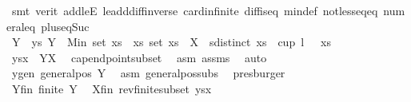 \begin{isabellebody}
\ {\isacharparenleft}{\kern0pt}smt\ {\isacharparenleft}{\kern0pt}verit{\isacharparenright}{\kern0pt}\ add{\isacharunderscore}{\kern0pt}leE\ le{\isacharunderscore}{\kern0pt}add{\isacharunderscore}{\kern0pt}diff{\isacharunderscore}{\kern0pt}inverse\ card{\isachardot}{\kern0pt}infinite\ diff{\isacharunderscore}{\kern0pt}is{\isacharunderscore}{\kern0pt}{}{\isacharunderscore}{\kern0pt}eq\ min{\isacharunderscore}{\kern0pt}def\ not{\isacharunderscore}{\kern0pt}less{\isacharunderscore}{\kern0pt}eq{\isacharunderscore}{\kern0pt}eq\ numeral{\isacharunderscore}{\kern0pt}{}{\isacharunderscore}{\kern0pt}eq{\isacharunderscore}{\kern0pt}{}\ plus{\isacharunderscore}{\kern0pt}{}{\isacharunderscore}{\kern0pt}eq{\isacharunderscore}{\kern0pt}Suc{\isacharparenright}{\kern0pt}\isanewline
\isanewline
\ \ \ \ \ \ \ \ \isamarkupfalse%
\ Y\ \ ys{\isacharcolon}{\kern0pt}\ {\isachardoublequoteopen}Y\ {\isacharequal}{\kern0pt}\ {\isacharbraceleft}{\kern0pt}Min\ {\isacharparenleft}{\kern0pt}set\ xs{\isacharparenright}{\kern0pt}\ {\isacharbar}{\kern0pt}\ xs{\isachardot}{\kern0pt}\ set\ xs\ {\isasymsubseteq}\ X\ {\isasymand}\ sdistinct\ xs\ {\isasymand}\ cup\ {\isacharparenleft}{\kern0pt}l\ {\isacharminus}{\kern0pt}\ {}{\isacharparenright}{\kern0pt}\ xs{\isacharbraceright}{\kern0pt}{\isachardoublequoteclose}\isanewline
\ \ \ \ \ \ \ \ \isamarkupfalse%
\ ysx{\isacharcolon}{\kern0pt}\ \ {\isachardoublequoteopen}Y{\isasymsubseteq}X{\isachardoublequoteclose}\ \isamarkupfalse%
\ cap{\isacharunderscore}{\kern0pt}endpoint{\isacharunderscore}{\kern0pt}subset\ \isamarkupfalse%
\ asm\ assms\ \isamarkupfalse%
\ auto\isanewline
\ \ \ \ \ \ \ \ \isamarkupfalse%
\ ygen{\isacharcolon}{\kern0pt}\ {\isachardoublequoteopen}general{\isacharunderscore}{\kern0pt}pos\ Y{\isachardoublequoteclose}\ \isamarkupfalse%
\ asm{\isacharparenleft}{\kern0pt}{}{\isacharparenright}{\kern0pt}\ general{\isacharunderscore}{\kern0pt}pos{\isacharunderscore}{\kern0pt}subs\ \isamarkupfalse%
\ presburger\isanewline
\ \ \ \ \ \ \ \ \isamarkupfalse%
\ Y{\isacharunderscore}{\kern0pt}fin{\isacharcolon}{\kern0pt}\ {\isachardoublequoteopen}finite\ Y{\isachardoublequoteclose}\ \isamarkupfalse%
\ X{\isacharunderscore}{\kern0pt}fin\ rev{\isacharunderscore}{\kern0pt}finite{\isacharunderscore}{\kern0pt}subset\ ysx\ \isamarkupfalse%

\end{isabellebody}
